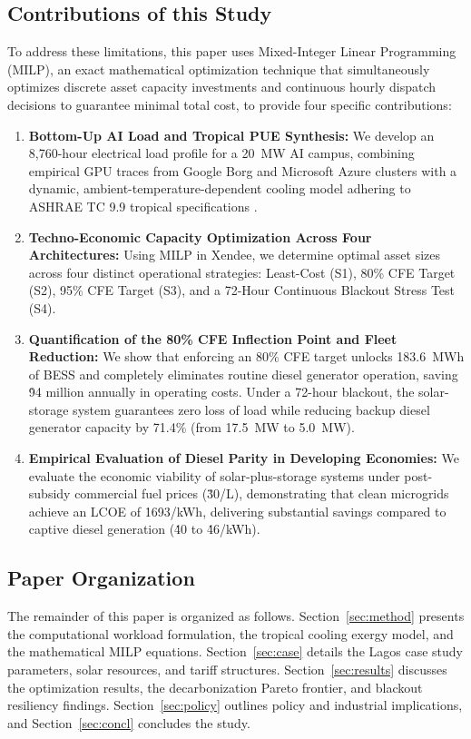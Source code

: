 \documentclass[11pt,a4paper]{article}
\begin{document}
\subsection{Contributions of this Study}
\label{sec:contributions}

To address these limitations, this paper uses Mixed-Integer Linear Programming (MILP), an exact mathematical optimization technique that simultaneously optimizes discrete asset capacity investments and continuous hourly dispatch decisions to guarantee minimal total cost, to provide four specific contributions:
\begin{enumerate}
    \item \textbf{Bottom-Up AI Load and Tropical PUE Synthesis:} We develop an 8,760-hour electrical load profile for a 20~MW AI campus, combining empirical GPU traces from Google Borg \cite{Reiss2012} and Microsoft Azure \cite{Cortez2017} clusters with a dynamic, ambient-temperature-dependent cooling model adhering to ASHRAE TC 9.9 tropical specifications \cite{ASHRAE2021}.
    \item \textbf{Techno-Economic Capacity Optimization Across Four Architectures:} Using MILP in Xendee, we determine optimal asset sizes across four distinct operational strategies: Least-Cost (S1), 80\% CFE Target (S2), 95\% CFE Target (S3), and a 72-Hour Continuous Blackout Stress Test (S4).
    \item \textbf{Quantification of the 80\% CFE Inflection Point and Fleet Reduction:} We show that enforcing an 80\% CFE target unlocks 183.6~MWh of BESS and completely eliminates routine diesel generator operation, saving \.94 million annually in operating costs. Under a 72-hour blackout, the solar-storage system guarantees zero loss of load while reducing backup diesel generator capacity by 71.4\% (from 17.5~MW to 5.0~MW).
    \item \textbf{Empirical Evaluation of Diesel Parity in Developing Economies:} We evaluate the economic viability of solar-plus-storage systems under post-subsidy commercial fuel prices (\.30/L), demonstrating that clean microgrids achieve an LCOE of \.1693/kWh, delivering substantial savings compared to captive diesel generation (\.40 to \.46/kWh).
\end{enumerate}

\subsection{Paper Organization}
The remainder of this paper is organized as follows. Section~\ref{sec:method} presents the computational workload formulation, the tropical cooling exergy model, and the mathematical MILP equations. Section~\ref{sec:case} details the Lagos case study parameters, solar resources, and tariff structures. Section~\ref{sec:results} discusses the optimization results, the decarbonization Pareto frontier, and blackout resiliency findings. Section~\ref{sec:policy} outlines policy and industrial implications, and Section~\ref{sec:concl} concludes the study.
\end{document}
